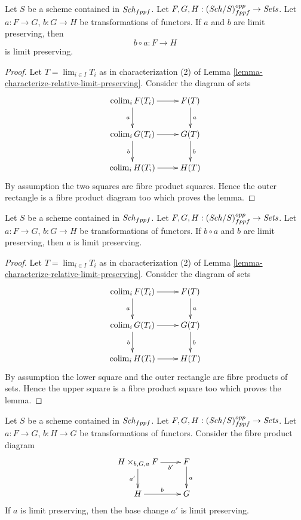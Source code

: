 \begin{lemma}
\label{lemma-composition-locally-finite-presentation}
Let $S$ be a scheme contained in $\mathit{Sch}_{fppf}$.
Let $F, G, H : (\mathit{Sch}/S)_{fppf}^{opp} \to \textit{Sets}$.
Let $a : F \to G$, $b : G \to H$ be transformations of functors.
If $a$ and $b$ are limit preserving, then
$$
b \circ a : F \longrightarrow H
$$
is limit preserving.
\end{lemma}

\begin{proof}
Let $T = \lim_{i \in I} T_i$ as in characterization (2) of
Lemma \ref{lemma-characterize-relative-limit-preserving}.
Consider the diagram of sets
$$
\xymatrix{
\colim_i F(T_i) \ar[r] \ar[d]_a & F(T) \ar[d]^a \\
\colim_i G(T_i) \ar[r] \ar[d]_b & G(T) \ar[d]^b \\
\colim_i H(T_i) \ar[r] & H(T)
}
$$
By assumption the two squares are fibre product squares. Hence the
outer rectangle is a fibre product diagram too which proves the lemma.
\end{proof}

\begin{lemma}
\label{lemma-locally-finite-presentation-permanence}
Let $S$ be a scheme contained in $\mathit{Sch}_{fppf}$.
Let $F, G, H : (\mathit{Sch}/S)_{fppf}^{opp} \to \textit{Sets}$.
Let $a : F \to G$, $b : G \to H$ be transformations of functors.
If $b \circ a$ and $b$ are limit preserving, then $a$
is limit preserving.
\end{lemma}

\begin{proof}
Let $T = \lim_{i \in I} T_i$ as in characterization (2) of
Lemma \ref{lemma-characterize-relative-limit-preserving}.
Consider the diagram of sets
$$
\xymatrix{
\colim_i F(T_i) \ar[r] \ar[d]_a & F(T) \ar[d]^a \\
\colim_i G(T_i) \ar[r] \ar[d]_b & G(T) \ar[d]^b \\
\colim_i H(T_i) \ar[r] & H(T)
}
$$
By assumption the lower square and the outer rectangle
are fibre products of sets. Hence the upper square
is a fibre product square too which proves the lemma.
\end{proof}

\begin{lemma}
\label{lemma-base-change-locally-finite-presentation}
Let $S$ be a scheme contained in $\mathit{Sch}_{fppf}$.
Let $F, G, H : (\mathit{Sch}/S)_{fppf}^{opp} \to \textit{Sets}$.
Let $a : F \to G$, $b : H \to G$ be transformations of functors.
Consider the fibre product diagram
$$
\xymatrix{
H \times_{b, G, a} F \ar[r]_-{b'} \ar[d]_{a'} & F \ar[d]^a \\
H \ar[r]^b & G
}
$$
If $a$ is limit preserving, then the base change $a'$ is limit preserving.
\end{lemma}

